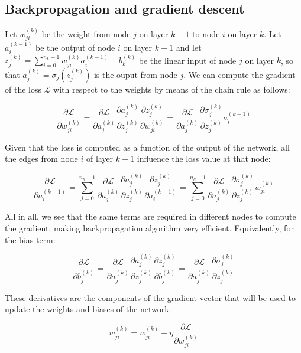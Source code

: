 \subsection{Backpropagation and gradient descent}

Let $w_{ji}^{(k)}$ be the weight from node $j$ on layer $k-1$ to node $i$ on layer $k$. Let $a_i^{(k-1)}$ be the output of node $i$ on layer $k-1$ and let $z_j^{(k)} = \sum_{i=0}^{n_k - 1} w_{ji}^{(k)} a_i^{(k-1)} + b_k^{(k)}$ be 
the linear input of node $j$ on layer $k$, so that $a_j^{(k)} = \sigma_j(z_j^{(k)})$ is the ouput from node $j$. We can compute the gradient of the loss $\mathcal{L}$ with respect to the weights by means of the chain rule as follows: 

$$  
\frac{\partial \mathcal{L}}{\partial w_{ji}^{(k)}} = \frac{\partial \mathcal{L}}{\partial a_{j}^{(k)}} \frac{\partial a_{j}^{(k)}}{\partial z_{j}^{(k)}} \frac {\partial z_{j}^{(k)}} {\partial w_{ji}^{(k)}} =
\frac{\partial \mathcal{L}}{\partial a_{j}^{(k)}} \frac{\partial \sigma_j^{(k)}}{\partial z_{j}^{(k)}} a_i^{(k-1)}
$$

Given that the loss is computed as a function of the output of the network, all the edges from node $i$ of layer $k-1$ influence the loss value at that node:

$$
\frac{\partial \mathcal{L}}{\partial a_{i}^{(k-1)}} = \sum_{j=0}^{n_{k} - 1} \frac{\partial \mathcal{L}}{\partial a_{j}^{(k)}}  \frac{\partial a_{j}^{(k)}}{\partial z_{j}^{(k)}} \frac{\partial z_{j}^{(k)}}{\partial a_{i}^{(k-1)}} =
\sum_{j=0}^{n_{k} - 1} \frac{\partial \mathcal{L}}{\partial a_{j}^{(k)}} \frac{\partial \sigma_j^{(k)}}{\partial z_{j}^{(k)}} w_{ji}^{(k)}
$$

All in all, we see that the same terms are required in different nodes to compute the gradient, making backpropagation algorithm very efficient. Equivalently, for the bias term:

$$
\frac{\partial \mathcal{L}}{\partial b_{j}^{(k)}} = \frac{\partial \mathcal{L}}{\partial a_{j}^{(k)}} \frac{\partial a_{j}^{(k)}}{\partial z_{j}^{(k)}} \frac {\partial z_{j}^{(k)}} {\partial b_{j}^{(k)}} = \frac{\partial \mathcal{L}}{\partial a_{j}^{(k)}} \frac{\partial \sigma_j^{(k)}}{\partial z_{j}^{(k)}}
$$

These derivatives are the components of the gradient vector that will be used to update the weights and biases of the network.

$$
w_{ji}^{(k)} = w_{ji}^{(k)} -\eta \frac{\partial \mathcal{L}}{\partial w_{ji}^{(k)}}
$$

